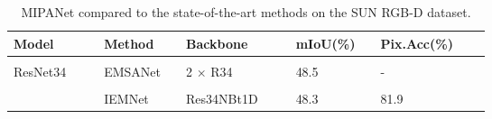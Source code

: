 \documentclass{aims}
\numberwithin{equation}{section}
\begin{document}
\begin{table}[t]
  \centering
  \caption{MIPANet compared to the state-of-the-art methods on the SUN RGB-D dataset.}
    \begin{tabular}{lllllllllllll}
    \toprule
    \toprule
    Model &       &       & Method &       &        Backbone &       &       & mIoU(\%)  &       &        Pix.Acc(\%) \\
    \midrule
          &       &       &       &       &       &       &       &       &       &       &         \\
    ResNet34 &       &       & EMSANet\cite{seichter2022efficient} &       &        2 $\times$  R34 &       &       & 48.5  &       &        - \\
          &       &       &       &       &       &       &       &       &       &       &         \\
         &       &       & IEMNet\cite{xu2023interactive} &       &        Res34NBt1D &       &       & 48.3  &       &        81.9 \\
          

\end{tabular}
\end{table}
\end{document}
